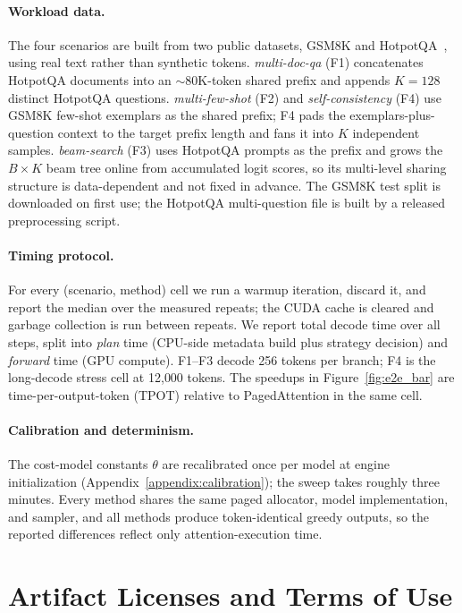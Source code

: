 \documentclass[11pt]{article}
\begin{document}
  \paragraph{Workload data.}
  The four scenarios are built from two public datasets, GSM8K and
  HotpotQA~\cite{yang2018hotpotqa}, using real text rather than synthetic
  tokens. \emph{multi-doc-qa} (F1) concatenates HotpotQA documents into
  an $\sim$80K-token shared prefix and appends $K{=}128$ distinct
  HotpotQA questions. \emph{multi-few-shot} (F2) and
  \emph{self-consistency} (F4) use GSM8K few-shot exemplars as the shared
  prefix; F4 pads the exemplars-plus-question context to the target
  prefix length and fans it into $K$ independent samples.
  \emph{beam-search} (F3) uses HotpotQA prompts as the prefix and grows
  the $B{\times}K$ beam tree online from accumulated logit scores, so its
  multi-level sharing structure is data-dependent and not fixed in
  advance. The GSM8K test split is downloaded on first use; the HotpotQA
  multi-question file is built by a released preprocessing script.

  \paragraph{Timing protocol.}
  For every (scenario, method) cell we run a warmup iteration, discard
  it, and report the median over the measured repeats; the CUDA cache is
  cleared and garbage collection is run between repeats. We report total
  decode time over all steps, split into \emph{plan} time (CPU-side
  metadata build plus strategy decision) and \emph{forward} time (GPU
  compute). F1--F3 decode 256 tokens per branch; F4 is the long-decode
  stress cell at 12{,}000 tokens. The speedups in
  Figure~\ref{fig:e2e_bar} are time-per-output-token (TPOT) relative to
  PagedAttention in the same cell.

  \paragraph{Calibration and determinism.}
  The cost-model constants $\theta$ are recalibrated once per model at
  engine initialization (Appendix~\ref{appendix:calibration}); the sweep
  takes roughly three minutes. Every method shares the same paged
  allocator, model implementation, and sampler, and all methods produce
  token-identical greedy outputs, so the reported differences reflect
  only attention-execution time.
  
\section{Artifact Licenses and Terms of Use}
\label{appendix:licenses}
\end{document}
